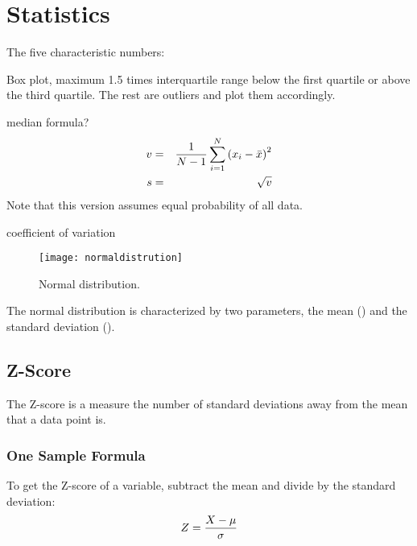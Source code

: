 	\chapter{Statistics}

The five characteristic numbers:
	\begin{plainlist}
		\item \xsmallest{}
		\item \quartileone{}
		\item \quartiletwo{}
		\item \quartilethree{}
		\item \xlargest{}
	\end{plainlist}

Box plot, maximum 1.5 times interquartile range below the first quartile or above the third quartile.  The rest are outliers and plot them accordingly.



median formula?
	\begin{eqnarray}
		\mbox{$v$} 					& = & \frac{1}{N-1}\sum^N_{i=1}\left(x_i - \mbox{$\bar{x}$}\right)^2 \\
		\mbox{$s$}	& = & \sqrt{\mbox{$v$}}
	\end{eqnarray}
Note that this version assumes equal probability of all data.



coefficient of variation

	\begin{figure}[tbp]
		\centering
		\texttt{[image: normaldistrution]}
		\caption[Normal distribution]{Normal distribution.}
		\label{fig:normaldistrution}
	\end{figure}

The normal distribution is characterized by two parameters, the mean (\populationmean) and the standard deviation (\populationstandarddeviation).

	\section{Z-Score}
The Z-score is a measure the number of standard deviations away from the mean that a data point is.

	\subsection{One Sample Formula}
To get the Z-score of a variable, subtract the mean and divide by the standard deviation:
	\begin{equation}
		Z = \frac{X-\mbox{$\mu$}}{\mbox{$\sigma$}}
	\end{equation}
	\begin{mathwhere}
	\end{mathwhere}

